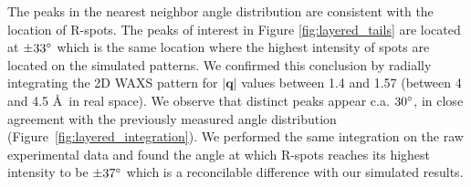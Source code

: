 \documentclass{article}
\begin{document}
  The peaks in the nearest neighbor angle distribution are consistent with the
  location of R-spots. The peaks of interest in Figure \ref{fig:layered_tails} 
  are located at $\pm 33 \degree$ which is the same
  location where the highest intensity of spots are located on the simulated
  patterns. We confirmed this conclusion by radially integrating the 2D WAXS
  pattern for $\left|\mathbf{q}\right|$ values between 1.4 and 1.57 (between 4
  and 4.5 \AA~in real space). We observe that distinct peaks appear c.a. $30
  \degree$, in close agreement with the previously measured angle distribution
  (Figure~\ref{fig:layered_integration}). We
  performed the same integration on the raw experimental data and found the angle
  at which R-spots reaches its highest intensity to be $\pm 37 \degree$ which
  is a reconcilable difference with our simulated results.

\end{document}

